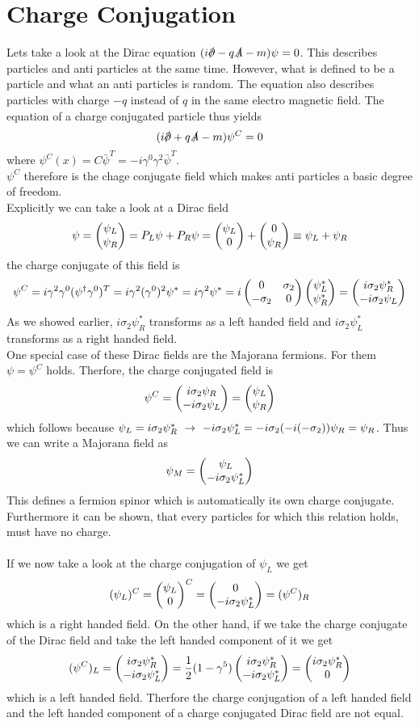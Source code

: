 \section{Charge Conjugation}
Lets take a look at the Dirac equation $(i \slashed{\p} - q \slashed{A} -m ) \psi = 0$. This describes particles and anti particles at the same time. However, what is defined to be a particle and what an anti particles is random. The equation also describes particles with charge $-q$ instead of $q$ in the same electro magnetic field. The equation of a charge conjugated particle thus yields
\[ ( i \slashed{\p} + q \slashed{A} - m) \psi^C = 0\]
where $\psi^C(x) = C \bar{\psi}^T = - i \gamma^0 \gamma^2 \bar{\psi}^T$.\\
$\psi^C$ therefore is the chage conjugate field which makes anti particles a basic degree of freedom.\\
Explicitly we can take a look at a Dirac field
\[ \psi = \begin{pmatrix} \psi_L \\ \psi_R \end{pmatrix} = P_L \psi + P_R\psi = \begin{pmatrix} \psi_L \\ 0 \end{pmatrix} + \begin{pmatrix} 0 \\ \psi_R \end{pmatrix} \equiv \psi_L + \psi_R\]
the charge conjugate of this field is
\[ \psi^C = i \gamma^2 \gamma^0 ( \psi^\dagger \gamma^0 )^T = i \gamma^2 (\gamma^0)^2 \psi^* = i \gamma^2 \psi^* = i \begin{pmatrix}0&\sigma_2\\-\sigma_2&0\end{pmatrix} \begin{pmatrix} \psi_L^* \\ \psi_R^* \end{pmatrix} = \begin{pmatrix} i \sigma_2 \psi_R^* \\ -i\sigma_2\psi_L \end{pmatrix}\]
As we showed earlier, $i \sigma_2 \psi_R^*$ transforms as a left handed field and $i \sigma_2 \psi_L^*$ transforms as a right handed field.\\
One special case of these Dirac fields are the Majorana fermions. For them $\psi = \psi^C$ holds. Therfore, the charge conjugated field is
\[ \psi^C = \begin{pmatrix} i \sigma_2 \psi_R \\ -i \sigma_2 \psi_L \end{pmatrix} = \begin{pmatrix} \psi_L \\ \psi_R \end{pmatrix}\]
which follows because $\psi_L = i \sigma_2 \psi_R^* ~\rightarrow~ -i \sigma_2 \psi_L^* = -i \sigma_2( -i(-\sigma_2)) \psi_R = \psi_R$. Thus we can write a Majorana field as
\[ \psi_M = \begin{pmatrix} \psi_L \\ -i \sigma_2 \psi_L^* \end{pmatrix}\]
This defines a fermion spinor which is automatically its own charge conjugate. Furthermore it can be shown, that every particles for which this relation holds, must have no charge.\\
\\
If we now take a look at the charge conjugation of $\psi_L$ we get
\[ (\psi_L)^C = \begin{pmatrix} \psi_L \\ 0 \end{pmatrix}^C = \begin{pmatrix}  0 \\ -i \sigma_2 \psi_L^* \end{pmatrix} = (\psi^C)_R\]
which is a right handed field. On the other hand, if we take the charge conjugate of the Dirac field and take the left handed component of it we get
\[ (\psi^C)_L = \begin{pmatrix}  i \sigma_2 \psi_R^* \\ -i \sigma_2 \psi_L^* \end{pmatrix} = \frac{1}{2} ( 1 - \gamma^5) \begin{pmatrix}  i \sigma_2 \psi_R^*  \\ -i \sigma_2 \psi_L^* \end{pmatrix} = \begin{pmatrix}  i \sigma_2 \psi_R^* \\ 0 \end{pmatrix} \]
which is a left handed field. Therfore the charge conjugation of a left handed field and the left handed component of a charge conjugated Dirac field are not equal.


 
